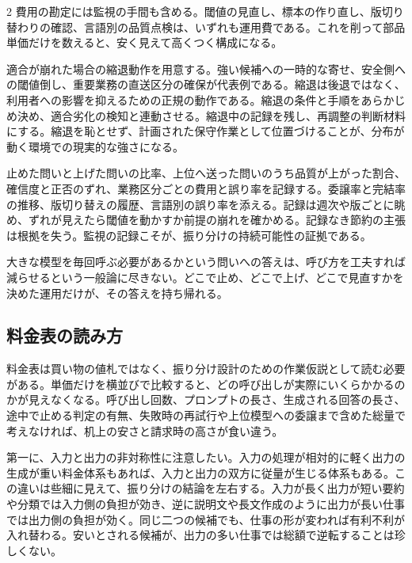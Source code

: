 \documentclass[lualatex,a4paper,10pt]{jlreq}
\begin{document}
\begin{multicols}{2}
費用の勘定には監視の手間も含める。閾値の見直し、標本の作り直し、版切り替わりの確認、言語別の品質点検は、いずれも運用費である。これを削って部品単価だけを数えると、安く見えて高くつく構成になる。

\begin{themeoverview}[縮退動作の用意]
適合が崩れた場合の縮退動作を用意する。強い候補への一時的な寄せ、安全側への閾値倒し、重要業務の直送区分の確保が代表例である。縮退は後退ではなく、利用者への影響を抑えるための正規の動作である。縮退の条件と手順をあらかじめ決め、適合劣化の検知と連動させる。縮退中の記録を残し、再調整の判断材料にする。縮退を恥とせず、計画された保守作業として位置づけることが、分布が動く環境での現実的な強さになる。
\end{themeoverview}

\begin{themeoverview}[監視の記録項目]
止めた問いと上げた問いの比率、上位へ送った問いのうち品質が上がった割合、確信度と正否のずれ、業務区分ごとの費用と誤り率を記録する。委譲率と完結率の推移、版切り替えの履歴、言語別の誤り率を添える。記録は週次や版ごとに眺め、ずれが見えたら閾値を動かすか前提の崩れを確かめる。記録なき節約の主張は根拠を失う。監視の記録こそが、振り分けの持続可能性の証拠である。
\end{themeoverview}大きな模型を毎回呼ぶ必要があるかという問いへの答えは、呼び方を工夫すれば減らせるという一般論に尽きない。どこで止め、どこで上げ、どこで見直すかを決めた運用だけが、その答えを持ち帰れる\autocite{frugalgpt}\autocite{sysone}\autocite{sysoneconcepts}。

\subsection{料金表の読み方}
料金表は買い物の値札ではなく、振り分け設計のための作業仮説として読む必要がある。単価だけを横並びで比較すると、どの呼び出しが実際にいくらかかるのかが見えなくなる。呼び出し回数、プロンプトの長さ、生成される回答の長さ、途中で止める判定の有無、失敗時の再試行や上位模型への委譲まで含めた総量で考えなければ、机上の安さと請求時の高さが食い違う\autocite{frugalgpt}。

第一に、入力と出力の非対称性に注意したい。入力の処理が相対的に軽く出力の生成が重い料金体系もあれば、入力と出力の双方に従量が生じる体系もある。この違いは些細に見えて、振り分けの結論を左右する。入力が長く出力が短い要約や分類では入力側の負担が効き、逆に説明文や長文作成のように出力が長い仕事では出力側の負担が効く。同じ二つの候補でも、仕事の形が変われば有利不利が入れ替わる。安いとされる候補が、出力の多い仕事では総額で逆転することは珍しくない。


\end{multicols}
\end{document}
